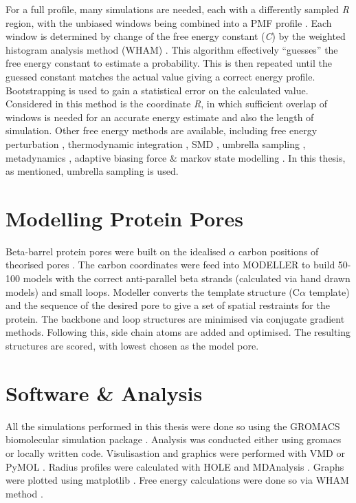 For a full profile, many simulations are needed, each with a differently sampled \textit{R} region, with the unbiased windows being combined into a PMF profile \cite{Roux1995}. Each window is determined by change of the free energy constant (\textit{C}) by the weighted histogram analysis method (WHAM) \cite{Grossfield}. This algorithm effectively ``guesses'' the free energy constant to estimate a probability. This is then repeated until the guessed constant matches the actual value giving a correct energy profile. Bootstrapping is used to gain a statistical error on the calculated value. Considered in this method is the coordinate \textit{R}, in which sufficient overlap of windows is needed for an accurate energy estimate and also the length of simulation. Other free energy methods are available,   including free energy perturbation \cite{Zwanzig1954}, thermodynamic integration \cite{Straatsma1988}, SMD \cite{Park2003}, umbrella sampling \cite{Torrie1977}, metadynamics \cite{Laio2002}, adaptive biasing force \cite{Darve2001} \& markov state modelling \cite{Prinz2011}. In this thesis, as mentioned, umbrella sampling is used. 


\section{Modelling Protein Pores}

Beta-barrel protein pores were built on the idealised $\alpha$ carbon positions of theorised pores \cite{Sansom1995}. The carbon coordinates were feed into MODELLER \cite{Sali1993} to build 50-100 models with the correct anti-parallel beta strands (calculated via hand drawn models) and small loops. Modeller converts the template structure (C$\alpha$ template) and the sequence of the desired pore to give a set of spatial restraints for the protein. The backbone and loop structures are minimised via conjugate gradient methods. Following this, side chain atoms are added and optimised. The resulting structures are scored, with lowest chosen as the model pore.

\section{Software \& Analysis}

All the simulations performed in this thesis were done so using the GROMACS biomolecular simulation package \cite{Scott1999}. Analysis was conducted either using gromacs or locally written code. Visulisastion and graphics were performed with VMD \cite{Humphrey1996} or PyMOL \cite{PyMOL}. Radius profiles were calculated with HOLE \cite{Smart1996} and MDAnalysis \cite{Michaud-Agrawal2011,Stelzl2014}. Graphs were plotted using matplotlib \cite{Hunter2007}. Free energy calculations were done so via WHAM method \cite{Grossfield}.
